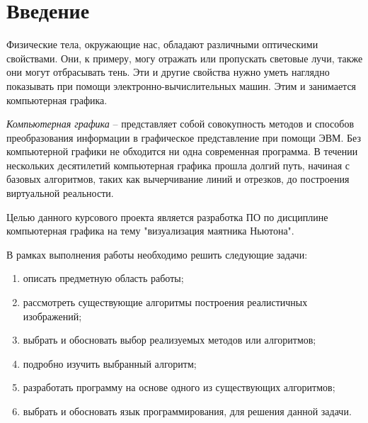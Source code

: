 \newpage
\chapter*{Введение}

Физические тела, окружающие нас, обладают различными оптическими свойствами. Они, к примеру, могу отражать или пропускать световые лучи,
также они могут отбрасывать тень. Эти и другие свойства нужно уметь наглядно показывать при помощи электронно-вычислительных машин.
Этим и занимается компьютерная графика.

\textit{Компьютерная графика} -- представляет собой совокупность методов и способов преобразования информации в графическое представление при помощи ЭВМ.
Без компьютерной графики не обходится ни одна современная программа. В течении нескольких десятилетий компьютерная графика прошла долгий путь, начиная с базовых
алгоритмов, таких как вычерчивание линий и отрезков, до построения виртуальной реальности.

Целью данного курсового проекта является разработка ПО по дисциплине компьютерная графика на тему "визуализация маятника Ньютона".

В рамках выполнения работы необходимо решить следующие задачи:

\begin{enumerate}
	\item описать предметную область работы;
	\item рассмотреть существующие алгоритмы построения реалистичных изображений;
	\item выбрать и обосновать выбор реализуемых методов или алгоритмов;
	\item подробно изучить выбранный алгоритм;
	\item разработать программу на основе одного из существующих алгоритмов;
	\item выбрать и обосновать язык программирования, для решения данной задачи.
\end{enumerate}
